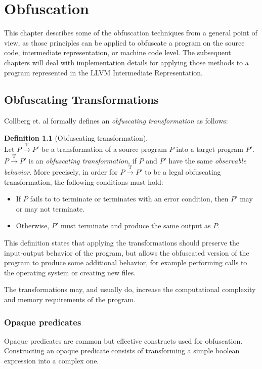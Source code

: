 \documentclass[
  digital, %
  notable,   %
  twoside, %
  nolof,     %
  nolot,     %
]{fithesis3}
\theoremstyle{definition}
\newtheorem{definition}{Definition}[section]
\begin{document}
\chapter{Obfuscation} \label{chap:obf}
 
This chapter describes some of the obfuscation techniques from a general point of view, as those principles can be applied to obfuscate a program on the source code, intermediate representation, or machine code level. The subsequent chapters will deal with implementation details for applying those methods to a program represented in the LLVM Intermediate Representation. 

\section{Obfuscating Transformations}

Collberg et. al \cite{taxonomy_obf} formally defines an \textit{obfuscating transformation} as follows:

\begin{definition}[Obfuscating transformation]{\ \\} \label{def:transformation}
Let $P \xrightarrow{\text{T}} P'$ be a transformation of a source program $P$ into a target program $P'$.
$P \xrightarrow{\text{T}} P'$ is an \textit{obfuscating transformation}, if $P$ and $P'$ have the same \textit{observable behavior}. More precisely, in order for $P \xrightarrow{\text{T}} P'$ to be a legal obfuscating transformation, the following conditions must hold:
\begin{itemize}
    \item If $P$ fails to to terminate or terminates with an error
condition, then $P'$ may or may not terminate.
    \item Otherwise, $P'$ must terminate and produce the same output as $P$. 
\end{itemize}
\end{definition}

This definition states that applying the transformations should preserve the input-output behavior of the program, but allows the obfuscated version of the program to produce some additional behavior, for example performing calls to the operating system or creating new files. 

The transformations may, and usually do, increase the computational complexity and memory requirements of the program. 

\subsection{Opaque predicates} \label{opaque}
Opaque predicates are common but effective constructs used for obfuscation. Constructing an opaque predicate consists of transforming a simple boolean expression into a complex one. 
\end{document}
